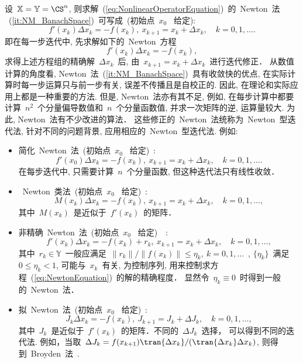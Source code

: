 设~$\mathbb{X}=\mathbb{Y} = \CS^n$,
则求解~(\ref{eq:NonlinearOperatorEquation})~的~Newton~法
~(\ref{it:NM_BanachSpace})~可写成~(初始点~$x_0$~
给定):
$$
f'(x_k) \Delta x_k = -f(x_k),\ x_{k+1} = x_k + \Delta x_k, \quad k =
0,1,\ldots.
$$
即在每一步迭代中, 先求解如下的~Newton~方程
\begin{equation}
\label{eq:NewtonEquation} f'(x_k)\Delta x_k = - f(x_k),
\end{equation}
求得上述方程组的精确解~$\Delta x_k$~后, 由~$x_{k+1} = x_k + \Delta
x_k$~进行迭代修正． 从数值计算的角度看,
Newton~法~(\ref{it:NM_BanachSpace})~具有收敛快的优点,
在实际计算时每一步运算只与前一步有关, 误差不传播且是自校正的. 因此,
在理论和实际应用上都是一种重要的方法. 但是, Newton~法亦有其不足,
例如, 在每步计算中都要计算~$n^2$~个分量偏导数值和~$n$~个分量函数值,
并求一次矩阵的逆, 运算量较大. 为此, Newton~法有不少改进的算法．
这些修正的~Newton~法统称为~Newton~型迭代法, 针对不同的问题背景,
应用相应的~Newton~型迭代法. 例如:
\begin{itemize}
\item
简化~Newton~法~(初始点~$x_0$~ 给定)~\cite{Ortega1970}:
$$
f'(x_0) \Delta x_k = -f(x_k),\ x_{k+1} = x_k + \Delta x_k,\quad k =
0,1,\ldots.
$$
在每步迭代中, 只需要计算~$n$~个分量函数, 但这种迭代法只有线性收敛．
\item
~Newton~类法~(初始点~$x_0$~ 给定)~\cite{Rheinboldt1968}:
\begin{equation}
\label{it:NML_general} M(x_k)\Delta x_k = -f(x_k),\ x_{k+1} = x_k +
\Delta x_k,\quad k = 0,1,\ldots,
\end{equation}
其中~$M(x_k)$~是近似于~$f'(x_k)$~的矩阵．
\item
非精确~Newton~法~(初始点~$x_0$~
给定)~\cite{Dembo1982}~\cite{Dembo1982}:
\begin{equation}
\label{it:INM_BanachSpace} f'(x_k) \Delta x_k = -f(x_k) + r_k,\
x_{k+1} = x_k + \Delta x_k,\quad k = 0,1,\ldots,
\end{equation}
其中~$r_k \in \mathbb{Y}$~一般应满足~$\|r_k\|/\|f(x_k)\|\leqslant
\eta_k,\ k= 0,1,\ldots$~, $\{\eta_k\}$~满足~$0\leqslant \eta_k <1$,
可能与~$x_k$~有关, 为控制序列,
用来控制求方程~(\ref{eq:NewtonEquation})~的解的精确程度．
显然令~$\eta_k \equiv 0$~时得到一般的~Newton~法．
\item
拟~Newton~法~(初始点~$x_0$~ 给定)~\cite{Deuflhard2004}:
$$
J_k \Delta x_k = -f(x_k), \ J_{k+1} = J_k + \Delta J_k,\quad k =
0,1,\ldots,
$$
其中~$J_k$~是近似于~$f'(x_k)$~的矩阵．不同的~$\Delta J_k$~选择，
可以得到不同的迭代法. 例如，当取~$\Delta J_k =
f(x_{k+1})\tran{\Delta x_k}/(\tran{\Delta x_k}\Delta x_k)$,
则得到~Broyden~法~\cite{Broyden1965}.
\end{itemize}


